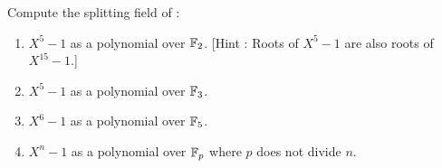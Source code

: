\documentclass[../book.tex]{subfiles}
\begin{document}
\begin{ex}
    
    Compute the splitting field of : \begin{enumerate}
        \item $X^5 - 1$ as a polynomial over $\mathbb{F}_2$. 
        [Hint : Roots of $X^5 - 1$ are also roots of $X^15 - 1$.]
        \item $X^5 - 1$ as a polynomial over $\mathbb{F}_3$.
        \item $X^6 - 1$ as a polynomial over $\mathbb{F}_5$.
        \item $X^n - 1$ as a polynomial over $\mathbb{F}_p$ where $p$ does not divide $n$.
    \end{enumerate}
    
\end{ex}
%
\end{document}
